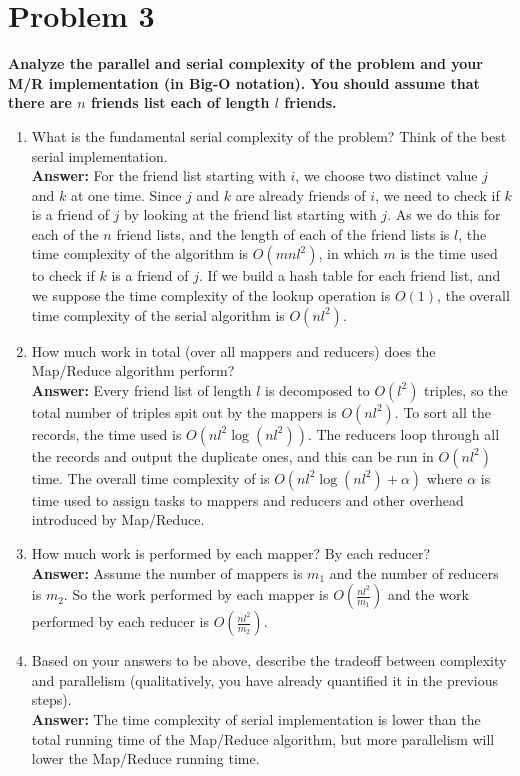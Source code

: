 \documentclass[letterpaper, 11pt]{article}
\begin{document}
\section*{Problem 3}
\textbf{Analyze the parallel and serial complexity of the problem and your M/R implementation (in Big-O notation). You should assume that there are $n$ friends list each of length $l$ friends.}
\begin{enumerate}
    \item What is the fundamental serial complexity of the problem? Think of the best serial implementation.\\
    \textbf{Answer:} For the friend list starting with $i$, we choose two distinct value $j$ and $k$ at one time. Since $j$ and $k$ are already friends of $i$, we need to check if $k$ is a friend of $j$ by looking at the friend list starting with $j$. As we do this for each of the $n$ friend lists, and the length of each of the friend lists is $l$, the time complexity of the algorithm is $O(mnl^2)$, in which $m$ is the time used to check if $k$ is a friend of $j$. If we build a hash table
    for each friend list, and we suppose the time complexity of the lookup operation is $O(1)$, the overall time complexity of the serial algorithm is $O(nl^2)$.
    \item How much work in total (over all mappers and reducers) does the Map/Reduce algorithm perform?\\
    \textbf{Answer:} Every friend list of length $l$ is decomposed to $O(l^2)$ triples, so the total number of triples spit out by the mappers is $O(nl^2)$. To sort all the records, the time used is $O(nl^2\log(nl^2))$. The reducers loop through all the records and output the duplicate ones, and this can be run in $O(nl^2)$ time. The overall time complexity of is $O(nl^2\log(nl^2)+\alpha)$ where $\alpha$ is time used to assign tasks to mappers and reducers and other overhead introduced
    by Map/Reduce.

    \item How much work is performed by each mapper? By each reducer?\\
    \textbf{Answer:} Assume the number of mappers is $m_1$ and the number of reducers is $m_2$. So the work performed by each mapper is $O(\frac{nl^2}{m_1})$ and the work performed by each reducer is $O(\frac{nl^2}{m_2})$.

    \item Based on your answers to be above, describe the tradeoff between complexity and parallelism (qualitatively, you have already quantified it in the previous steps).\\
    \textbf{Answer:} The time complexity of serial implementation is lower than the total running time of the Map/Reduce algorithm, but more parallelism will lower the Map/Reduce running time.
\end{enumerate}
\end{document}
